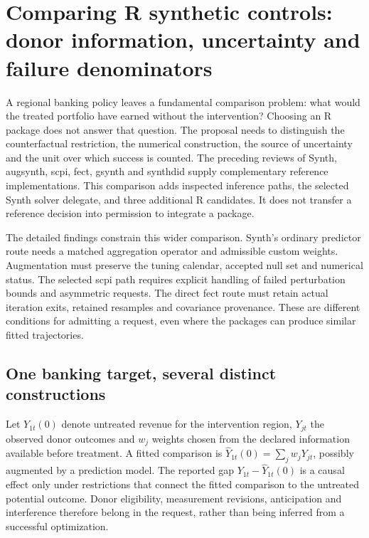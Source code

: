 \section{Comparing R synthetic controls: donor information, uncertainty and failure denominators}
\label{sec:exec25-synthetic-r-coverage}

A regional banking policy leaves a fundamental comparison problem: what would
the treated portfolio have earned without the intervention? Choosing an R
package does not answer that question. The proposal needs to distinguish the
counterfactual restriction, the numerical construction, the source of
uncertainty and the unit over which success is counted. The preceding reviews
of Synth, augsynth, scpi, fect, gsynth and synthdid supply complementary
reference implementations. This comparison adds inspected inference paths,
the selected Synth solver delegate, and three additional R candidates. It
does not transfer a reference decision into permission to integrate a package.
\citep{exec24_synth_source,exec24_augsynth_source,exec24_scpi_source,
exec24_fect_source,exec21_gsynth_wrapper,exec23_synthdid_reuse_source,
exec25_synthr_choice}

The detailed findings constrain this wider comparison. Synth's ordinary
predictor route needs a matched aggregation operator and admissible custom
weights. Augmentation must preserve the tuning calendar, accepted null set
and numerical status. The selected scpi path requires explicit handling of
failed perturbation bounds and asymmetric requests. The direct fect route
must retain actual iteration exits, retained resamples and covariance
provenance. These are different conditions for admitting a request, even
where the packages can produce similar fitted trajectories.

\subsection{One banking target, several distinct constructions}
Let $Y_{1t}(0)$ denote untreated revenue for the intervention region, $Y_{jt}$
the observed donor outcomes and $w_j$ weights chosen from the declared
information available before treatment. A fitted comparison is
$\widehat Y_{1t}(0)=\sum_jw_jY_{jt}$, possibly augmented by a prediction
model. The reported gap $Y_{1t}-\widehat Y_{1t}(0)$ is a causal effect only
under restrictions that connect the fitted comparison to the untreated
potential outcome. Donor eligibility, measurement revisions, anticipation
and interference therefore belong in the request, rather than being inferred
from a successful optimization.~\citep{exec25_synthr_choice}

